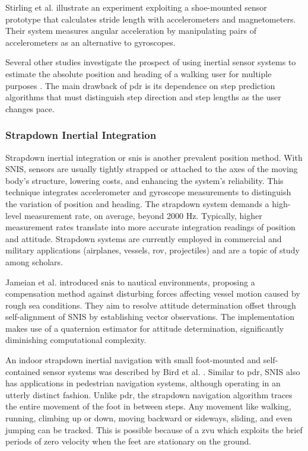 Stirling et al. \cite{stirling2003innovative} illustrate an experiment exploiting a shoe-mounted sensor prototype that calculates stride length with accelerometers and magnetometers. Their system measures angular acceleration by manipulating pairs of accelerometers as an alternative to gyroscopes.

Several other studies investigate the prospect of using inertial sensor systems to estimate the absolute position and heading of a walking user for multiple purposes \cite{steinhoff2010dead}\cite{weinberg2002using}\cite{kim2004step} \cite{collin2002mems}. The main drawback of \acrshort{pdr} is its dependence on step prediction algorithms that must distinguish step direction and step lengths as the user changes pace.

\subsubsection{Strapdown Inertial Integration}

Strapdown inertial integration or \acrfull{snis} is another prevalent position method. With SNIS, sensors are usually tightly strapped or attached to the axes of the moving body's structure, lowering costs, and enhancing the system's reliability. This technique integrates accelerometer and gyroscope measurements to distinguish the variation of position and heading. The strapdown system demands a high-level measurement rate, on average, beyond 2000 Hz. Typically, higher measurement rates translate into more accurate integration readings of position and attitude. Strapdown systems are currently employed in commercial and military applications (airplanes, vessels, \acrfull{rov}, projectiles) and are a topic of study among scholars.

Jameian et al. \cite{jameian2019robust}  introduced \acrshort{snis} to nautical environments, proposing a compensation method against disturbing forces affecting vessel motion caused by rough sea conditions. They aim to resolve attitude determination offset through self-alignment of SNIS by establishing vector observations. The implementation makes use of a quaternion estimator for attitude determination, significantly diminishing computational complexity.

An indoor strapdown inertial navigation with small foot-mounted and self-contained sensor systems was described by Bird et al. \cite{bird2011indoor}. Similar to \acrshort{pdr}, SNIS also has applications in pedestrian navigation systems, although operating in an utterly distinct fashion. Unlike \acrshort{pdr}, the strapdown navigation algorithm traces the entire movement of the foot in between steps. Any movement like walking, running, climbing up or down, moving backward or sideways, sliding, and even jumping can be tracked. This is possible because of a \acrfull{zvu} which exploits the brief periods of zero velocity when the feet are stationary on the ground.

